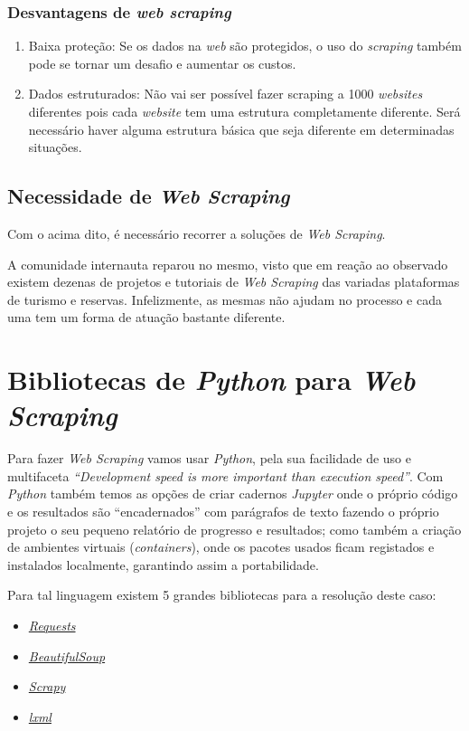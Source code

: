 \subsubsection{Desvantagens de \textit{web scraping}}

\begin{enumerate}
  \item Baixa proteção: Se os dados na \textit{web} são protegidos, o uso do \textit{scraping} também pode se tornar um desafio e aumentar os custos.
  \item Dados estruturados: Não vai ser possível fazer scraping a 1000 \textit{websites} diferentes pois cada \textit{website} tem uma estrutura completamente diferente. Será necessário haver alguma estrutura básica que seja diferente em determinadas situações.
\end{enumerate}

\subsection{Necessidade de \textit{Web Scraping}}

Com o acima dito, é necessário recorrer a soluções de \textit{Web Scraping}.

A comunidade internauta reparou no mesmo, visto que em reação ao observado existem dezenas de projetos e tutoriais de \textit{Web Scraping} das variadas plataformas de turismo e reservas.
Infelizmente, as mesmas não ajudam no processo e cada uma tem um forma de atuação bastante diferente.

\section{Bibliotecas de \textit{Python} para \textit{Web Scraping}}

Para fazer \textit{Web Scraping} vamos usar \textit{Python}, pela sua facilidade de uso e multifaceta \textit{``Development speed is more important than execution speed''}.
Com \textit{Python} também temos as opções de criar cadernos \textit{Jupyter} onde o próprio código e os resultados são ``encadernados'' com parágrafos de texto fazendo o próprio projeto o seu pequeno relatório de progresso e resultados; como também a criação de ambientes virtuais (\textit{containers}), onde os pacotes usados ficam registados e instalados localmente, garantindo assim a portabilidade.

Para tal linguagem existem 5 grandes bibliotecas para a resolução deste caso:
\begin{itemize}
  \item \textit{\href{https://pypi.org/project/requests/}{Requests}}
  \item \textit{\href{https://pypi.org/project/BeautifulSoup/}{BeautifulSoup}}
  \item \textit{\href{https://pypi.org/project/Scrapy3/}{Scrapy}}
  \item \textit{\href{https://pypi.org/project/lxml/}{lxml}}
\end{itemize}

